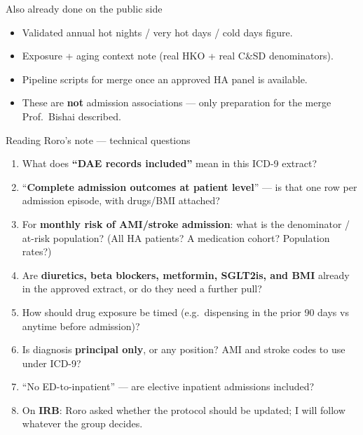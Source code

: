 \documentclass[aspectratio=169,11pt]{beamer}
\begin{document}
\begin{frame}{Also already done on the public side}
  \begin{itemize}
    \item Validated annual hot nights / very hot days / cold days figure.
    \item Exposure + aging context note (real HKO + real C\&SD denominators).
    \item Pipeline scripts for merge once an approved HA panel is available.
    \item These are \textbf{not} admission associations --- only preparation for the merge Prof.\ Bishai described.
  \end{itemize}
\end{frame}

\begin{frame}{Reading Roro's note --- technical questions}
  \footnotesize
  \begin{enumerate}
    \item What does \textbf{``DAE records included''} mean in this ICD-9 extract?
    \item ``\textbf{Complete admission outcomes at patient level}'' --- is that one row per admission episode, with drugs/BMI attached?
    \item For \textbf{monthly risk of AMI/stroke admission}: what is the denominator / at-risk population? (All HA patients? A medication cohort? Population rates?)
    \item Are \textbf{diuretics, beta blockers, metformin, SGLT2is, and BMI} already in the approved extract, or do they need a further pull?
    \item How should drug exposure be timed (e.g.\ dispensing in the prior 90 days vs anytime before admission)?
    \item Is diagnosis \textbf{principal only}, or any position? AMI and stroke codes to use under ICD-9?
    \item ``No ED-to-inpatient'' --- are elective inpatient admissions included?
    \item On \textbf{IRB}: Roro asked whether the protocol should be updated; I will follow whatever the group decides.
  \end{enumerate}
\end{frame}
\end{document}
